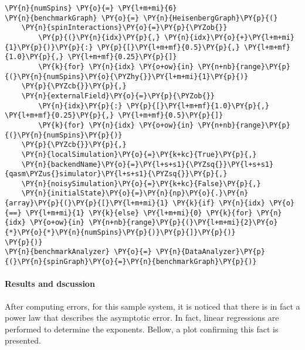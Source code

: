     \begin{tcolorbox}[breakable, size=fbox, boxrule=1pt, pad at break*=1mm,colback=cellbackground, colframe=cellborder]
\begin{Verbatim}[commandchars=\\\{\}]
\PY{n}{numSpins} \PY{o}{=} \PY{l+m+mi}{6}
\PY{n}{benchmarkGraph} \PY{o}{=} \PY{n}{HeisenbergGraph}\PY{p}{(}
    \PY{n}{spinInteractions}\PY{o}{=}\PY{p}{\PYZob{}}
        \PY{p}{(}\PY{n}{idx}\PY{p}{,} \PY{n}{idx}\PY{o}{+}\PY{l+m+mi}{1}\PY{p}{)}\PY{p}{:} \PY{p}{[}\PY{l+m+mf}{0.5}\PY{p}{,} \PY{l+m+mf}{1.0}\PY{p}{,} \PY{l+m+mf}{0.25}\PY{p}{]}
        \PY{k}{for} \PY{n}{idx} \PY{o+ow}{in} \PY{n+nb}{range}\PY{p}{(}\PY{n}{numSpins}\PY{o}{\PYZhy{}}\PY{l+m+mi}{1}\PY{p}{)}
    \PY{p}{\PYZcb{}}\PY{p}{,}
    \PY{n}{externalField}\PY{o}{=}\PY{p}{\PYZob{}}
        \PY{n}{idx}\PY{p}{:} \PY{p}{[}\PY{l+m+mf}{1.0}\PY{p}{,} \PY{l+m+mf}{0.25}\PY{p}{,} \PY{l+m+mf}{0.5}\PY{p}{]}
        \PY{k}{for} \PY{n}{idx} \PY{o+ow}{in} \PY{n+nb}{range}\PY{p}{(}\PY{n}{numSpins}\PY{p}{)}
    \PY{p}{\PYZcb{}}\PY{p}{,}
    \PY{n}{localSimulation}\PY{o}{=}\PY{k+kc}{True}\PY{p}{,}
    \PY{n}{backendName}\PY{o}{=}\PY{l+s+s1}{\PYZsq{}}\PY{l+s+s1}{qasm\PYZus{}simulator}\PY{l+s+s1}{\PYZsq{}}\PY{p}{,}
    \PY{n}{noisySimulation}\PY{o}{=}\PY{k+kc}{False}\PY{p}{,}
    \PY{n}{initialState}\PY{o}{=}\PY{n}{np}\PY{o}{.}\PY{n}{array}\PY{p}{(}\PY{p}{[}\PY{l+m+mi}{1} \PY{k}{if} \PY{n}{idx} \PY{o}{==} \PY{l+m+mi}{1} \PY{k}{else} \PY{l+m+mi}{0} \PY{k}{for} \PY{n}{idx} \PY{o+ow}{in} \PY{n+nb}{range}\PY{p}{(}\PY{l+m+mi}{2}\PY{o}{*}\PY{o}{*}\PY{n}{numSpins}\PY{p}{)}\PY{p}{]}\PY{p}{)}
\PY{p}{)}
\PY{n}{benchmarkAnalyzer} \PY{o}{=} \PY{n}{DataAnalyzer}\PY{p}{(}\PY{n}{spinGraph}\PY{o}{=}\PY{n}{benchmarkGraph}\PY{p}{)}
\end{Verbatim}
\end{tcolorbox}

    \hypertarget{results-and-dscussion}{%
\paragraph{Results and dscussion}\label{results-and-dscussion}}

After computing errors, for this sample system, it is noticed that there
is in fact a power law that describes the asymptotic error. In fact,
linear regressions are performed to determine the exponents. Bellow, a
plot confirming this fact is presented.

